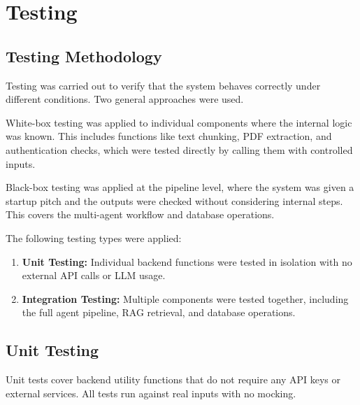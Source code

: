 \chapter{Testing}

\section{Testing Methodology}

Testing was carried out to verify that the system behaves correctly under different conditions. Two general approaches were used.

White-box testing was applied to individual components where the internal logic was known. This includes functions like text chunking, PDF extraction, and authentication checks, which were tested directly by calling them with controlled inputs.

Black-box testing was applied at the pipeline level, where the system was given a startup pitch and the outputs were checked without considering internal steps. This covers the multi-agent workflow and database operations.

The following testing types were applied:

\begin{enumerate}
    \item \textbf{Unit Testing:} Individual backend functions were tested in isolation with no external API calls or LLM usage.

    \item \textbf{Integration Testing:} Multiple components were tested together, including the full agent pipeline, RAG retrieval, and database operations.
\end{enumerate}

\section{Unit Testing}

Unit tests cover backend utility functions that do not require any API keys or external services. All tests run against real inputs with no mocking.

